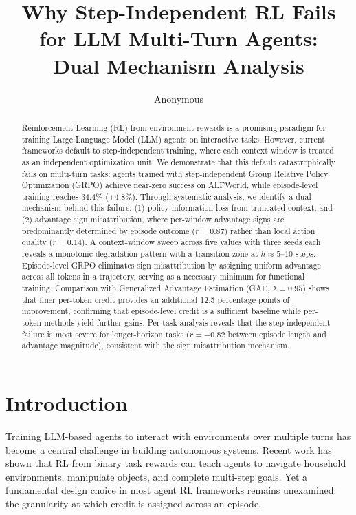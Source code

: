 \documentclass[11pt]{article}
\title{Why Step-Independent RL Fails for LLM Multi-Turn Agents:\\Dual Mechanism Analysis}
\author{Anonymous}
\date{}
\begin{document}
\maketitle

\begin{abstract}
Reinforcement Learning (RL) from environment rewards is a promising paradigm for training Large Language Model (LLM) agents on interactive tasks. However, current frameworks default to step-independent training, where each context window is treated as an independent optimization unit. We demonstrate that this default catastrophically fails on multi-turn tasks: agents trained with step-independent Group Relative Policy Optimization (GRPO) achieve near-zero success on ALFWorld, while episode-level training reaches 34.4\% ($\pm$4.8\%). Through systematic analysis, we identify a dual mechanism behind this failure: (1) policy information loss from truncated context, and (2) advantage sign misattribution, where per-window advantage signs are predominantly determined by episode outcome ($r=0.87$) rather than local action quality ($r=0.14$). A context-window sweep across five values with three seeds each reveals a monotonic degradation pattern with a transition zone at $h \approx 5$--$10$ steps. Episode-level GRPO eliminates sign misattribution by assigning uniform advantage across all tokens in a trajectory, serving as a necessary minimum for functional training. Comparison with Generalized Advantage Estimation (GAE, $\lambda=0.95$) shows that finer per-token credit provides an additional 12.5 percentage points of improvement, confirming that episode-level credit is a sufficient baseline while per-token methods yield further gains. Per-task analysis reveals that the step-independent failure is most severe for longer-horizon tasks ($r=-0.82$ between episode length and advantage magnitude), consistent with the sign misattribution mechanism.
\end{abstract}

\section{Introduction}

Training LLM-based agents to interact with environments over multiple turns has become a central challenge in building autonomous systems. Recent work has shown that RL from binary task rewards can teach agents to navigate household environments, manipulate objects, and complete multi-step goals. Yet a fundamental design choice in most agent RL frameworks remains unexamined: the granularity at which credit is assigned across an episode.
\end{document}
